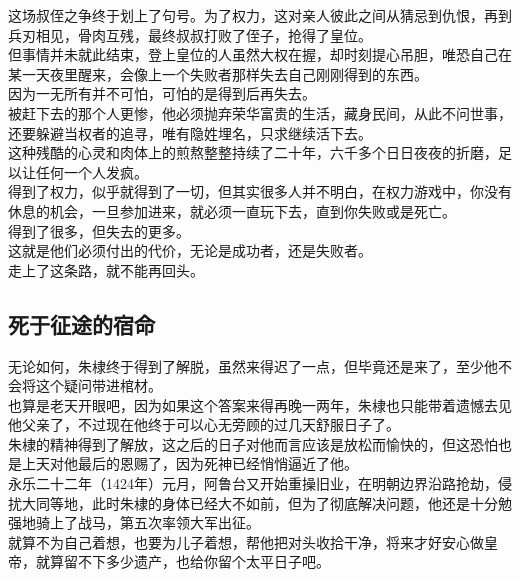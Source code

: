\begin{multicols}{\theparacolNo}
这场叔侄之争终于划上了句号。为了权力，这对亲人彼此之间从猜忌到仇恨，再到兵刃相见，骨肉互残，最终叔叔打败了侄子，抢得了皇位。\\

但事情并未就此结束，登上皇位的人虽然大权在握，却时刻提心吊胆，唯恐自己在某一天夜里醒来，会像上一个失败者那样失去自己刚刚得到的东西。\\

因为一无所有并不可怕，可怕的是得到后再失去。\\

被赶下去的那个人更惨，他必须抛弃荣华富贵的生活，藏身民间，从此不问世事，还要躲避当权者的追寻，唯有隐姓埋名，只求继续活下去。\\

这种残酷的心灵和肉体上的煎熬整整持续了二十年，六千多个日日夜夜的折磨，足以让任何一个人发疯。\\

得到了权力，似乎就得到了一切，但其实很多人并不明白，在权力游戏中，你没有休息的机会，一旦参加进来，就必须一直玩下去，直到你失败或是死亡。\\

得到了很多，但失去的更多。\\

这就是他们必须付出的代价，无论是成功者，还是失败者。\\

走上了这条路，就不能再回头。\\

\subsection{死于征途的宿命}
无论如何，朱棣终于得到了解脱，虽然来得迟了一点，但毕竟还是来了，至少他不会将这个疑问带进棺材。\\

也算是老天开眼吧，因为如果这个答案来得再晚一两年，朱棣也只能带着遗憾去见他父亲了，不过现在他终于可以心无旁顾的过几天舒服日子了。\\

朱棣的精神得到了解放，这之后的日子对他而言应该是放松而愉快的，但这恐怕也是上天对他最后的恩赐了，因为死神已经悄悄逼近了他。\\

永乐二十二年（1424年）元月，阿鲁台又开始重操旧业，在明朝边界沿路抢劫，侵扰大同等地，此时朱棣的身体已经大不如前，但为了彻底解决问题，他还是十分勉强地骑上了战马，第五次率领大军出征。\\

就算不为自己着想，也要为儿子着想，帮他把对头收拾干净，将来才好安心做皇帝，就算留不下多少遗产，也给你留个太平日子吧。\\


\end{multicols}
